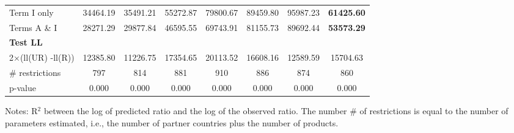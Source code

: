 \documentclass[a4paper,11pt]{article}
\begin{document}
\begin{table}[htbp]
\begin{center}
{\begin{tabular}{lccccccc}
Term I only & 34464.19 & 35491.21 & \multicolumn{1}{c}{55272.87} & \multicolumn{1}{c}{79800.67} & \multicolumn{1}{c}{89459.80} & \multicolumn{1}{c}{95987.23} & \multicolumn{1}{c}{\textbf{61425.60}} \\
Terms A \& I & 28271.29 & 29877.84 & \multicolumn{1}{c}{46595.55} & \multicolumn{1}{c}{69743.91} & \multicolumn{1}{c}{81155.73} & \multicolumn{1}{c}{89692.44} & \multicolumn{1}{c}{\textbf{53573.29}} \\
\textbf{Test LL} &       &       & \multicolumn{1}{c}{} & \multicolumn{1}{c}{} & \multicolumn{1}{c}{} & \multicolumn{1}{c}{} & \multicolumn{1}{c}{} \\
2$\times$(ll(UR) -ll(R)) & 12385.80 & 11226.75 & \multicolumn{1}{c}{17354.65} & \multicolumn{1}{c}{20113.52} & \multicolumn{1}{c}{16608.16} & \multicolumn{1}{c}{12589.59} & \multicolumn{1}{c}{15704.63} \\
\# restrictions  & 797   & 814   & \multicolumn{1}{c}{881} & \multicolumn{1}{c}{910} & \multicolumn{1}{c}{886} & \multicolumn{1}{c}{874} & \multicolumn{1}{c}{860} \\
p-value & 0.000 & 0.000 & \multicolumn{1}{c}{0.000} & \multicolumn{1}{c}{0.000} & \multicolumn{1}{c}{0.000} & \multicolumn{1}{c}{0.000} & \multicolumn{1}{c}{0.000} \\

\hline\hline
\end{tabular}}
\end{center}
  \vspace{-10pt}\tiny{Notes: R$^{2}$ between the log of predicted ratio and the log of the observed ratio. The number \# of restrictions is equal to the number of parameters estimated, i.e., the number of partner countries plus the number of products.}
\end{table}%
\end{document}
